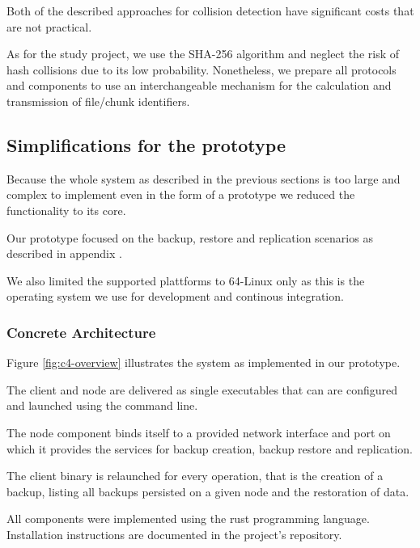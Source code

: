 Both of the described approaches for collision detection have significant costs that are not practical.

As for the study project, we use the SHA-256 algorithm\cite{sha-256} and neglect the risk of hash collisions due to its low probability. Nonetheless, we prepare all protocols and components to use an interchangeable mechanism for the calculation and transmission of file/chunk identifiers.

\subsection{Simplifications for the prototype}

Because the whole system as described in the previous sections is too large and complex to implement even in the form of a prototype we reduced the functionality to its core.

Our prototype focused on the backup, restore and replication scenarios as described in appendix .

We also limited the supported plattforms to 64-Linux only as this is the operating system we use for development and continous integration.

\subsubsection{Concrete Architecture}

Figure \ref{fig:c4-overview} illustrates the system as implemented in our prototype.

The \gls{client} and \gls{node} are delivered as single executables that can are configured and launched using the command line.

The \gls{node} component binds itself to a provided network interface and port on which it provides the services for backup creation, backup restore and replication.

The \gls{client} binary is relaunched for every operation, that is the creation of a backup,  listing all backups persisted on a given \gls{node} and the restoration of data.

All components were implemented using the rust programming language. Installation instructions are documented in the project's repository.

